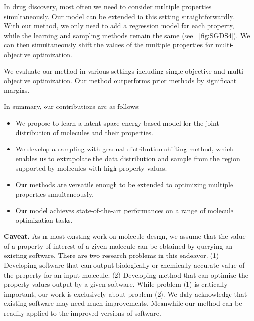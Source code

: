 \documentclass[accepted]{uai2023} %
\begin{document}
In drug discovery, most often we need to consider multiple properties simultaneously. Our model can be extended to this setting straightforwardly. With our method, we only need to add a regression model for each property, while the learning and sampling methods remain the same (see ~\cref{fig:SGDS4}). We can then simultaneously shift the values of the multiple properties for multi-objective optimization. %

We evaluate our method in various settings including single-objective and multi-objective optimization. Our method outperforms prior methods by significant margins. 

In summary, our contributions are as follows: 
\begin{itemize}[leftmargin=*]
    \itemsep0em 
    \item We propose to learn a latent space energy-based model for the joint distribution of molecules and their properties.
    \item We develop a {sampling with gradual distribution shifting} method, which enables us to extrapolate the data distribution and sample from the region supported by molecules with high property values. 
    \item Our methods are versatile enough to be extended to optimizing multiple properties simultaneously.
    \item Our model achieves state-of-the-art performances on a range of molecule optimization tasks.
\end{itemize}

{\bf Caveat.} As in most existing work on molecule design, we assume that the value of a property of interest of a given molecule can be obtained by querying an existing software. There are two research problems in this endeavor. (1) Developing software that can output biologically or chemically accurate value of the property for an input molecule. (2) Developing method that can optimize the property values output by a given software. While problem (1) is critically important, our work is exclusively about problem (2). We duly acknowledge that existing software may need much improvements. Meanwhile our method can be readily applied to the improved versions of software. 
\end{document}
